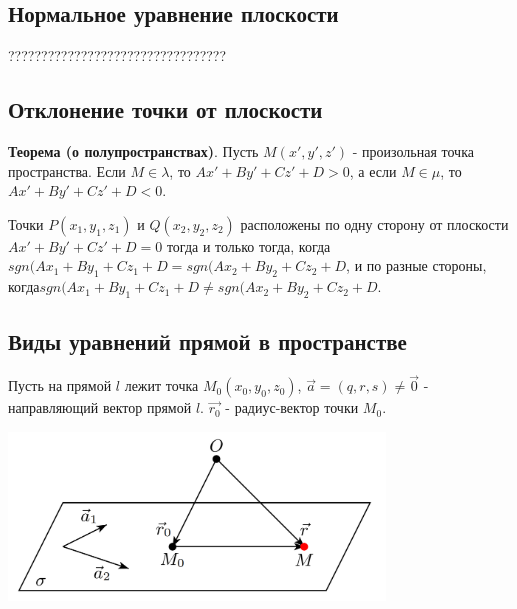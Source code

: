 \documentclass[a4paper]{article}
\begin{document}
    \newpage \begin{center}
                 \begin{Large}
                 \end{Large}
    \end{center}
    \subsection*{Нормальное уравнение плоскости}

    ?????????????????????????????????

    \subsection*{Отклонение точки от плоскости}

    \begin{htheorem}
        \textbf{Теорема (о полупространствах)}. Пусть $M(x', y', z')$ - произольная точка пространства. Если $M \in \lambda$, то $Ax' + By' + Cz' + D > 0$, а если $M \in \mu$, то $Ax' + By' + Cz' + D < 0$.

        Точки $P(x_1, y_1, z_1)$ и $Q(x_2, y_2, z_2)$ расположены по одну сторону от плоскости\newline $Ax' + By' + Cz' + D = 0$ тогда и только тогда, когда\newline $sgn(Ax_1 + By_1 +Cz_1+D = sgn(Ax_2 + By_2 + Cz_2 + D$, и по разные стороны, когда\newline $sgn(Ax_1 + By_1 +Cz_1+D \neq sgn(Ax_2 + By_2 + Cz_2 + D$.
    \end{htheorem}


    \newpage \begin{center}
                 \begin{Large}
                 \end{Large}
    \end{center}
    \subsection*{Виды уравнений прямой в пространстве}

    Пусть на прямой $l$ лежит точка $M_0(x_0,y_0,z_0)$, $\vec{a} = (q,r,s) \neq \vec{0}$ - направляющий вектор прямой $l$. $\vec{r_0}$ - радиус-вектор точки $M_0$.

    \includegraphics[width=10cm]{t8}
\end{document}
